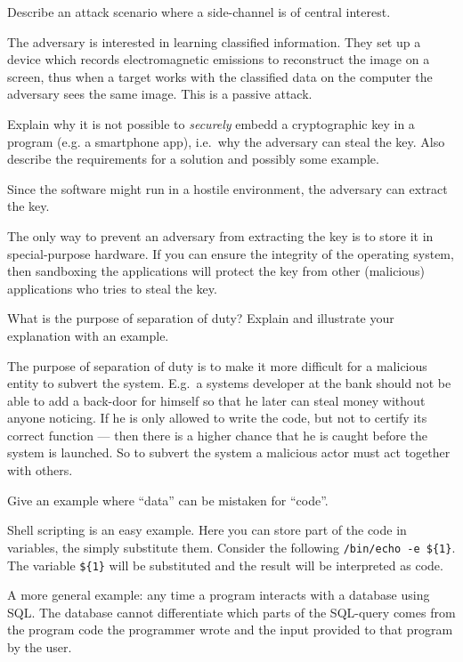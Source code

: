   
\question[3]\label{q:sidechannels}
Describe an attack scenario where a side-channel is of central interest.

\begin{solution}
  The adversary is interested in learning classified information.
  They set up a device which records electromagnetic emissions to reconstruct 
  the image on a screen, thus when a target works with the classified data on 
  the computer the adversary sees the same image.
  This is a passive attack.
\end{solution}

\question[3]
  Explain why it is not possible to \emph{securely} embedd a cryptographic key 
  in a program (e.g. a smartphone app), i.e.\ why the adversary can steal the 
  key.
  Also describe the requirements for a solution and possibly some example.

  \begin{solution}
    Since the software might run in a hostile environment, the adversary can 
    extract the key.

    The only way to prevent an adversary from extracting the key is to store it 
    in special-purpose hardware.
    If you can ensure the integrity of the operating system, then sandboxing 
    the applications will protect the key from other (malicious) applications 
    who tries to steal the key.
  \end{solution}

\question[3]
What is the purpose of separation of duty?
Explain and illustrate your explanation with an example.

\begin{solution}
  The purpose of separation of duty is to make it more difficult for 
  a malicious entity to subvert the system.
  E.g.\ a systems developer at the bank should not be able to add a back-door 
  for himself so that he later can steal money without anyone noticing.
  If he is only allowed to write the code, but not to certify its correct 
  function --- then there is a higher chance that he is caught before the 
  system is launched.
  So to subvert the system a malicious actor must act together with others.
\end{solution}


\question[3]
Give an example where \enquote{data} can be mistaken for \enquote{code}.

\begin{solution}
  Shell scripting is an easy example.
  Here you can store part of the code in variables, the simply substitute them.
  Consider the following \texttt{/bin/echo -e \$\{1\}}.
  The variable \texttt{\$\{1\}} will be substituted and the result will be 
  interpreted as code.

  A more general example: any time a program interacts with a database using 
  SQL.
  The database cannot differentiate which parts of the SQL-query comes from the 
  program code the programmer wrote and the input provided to that program by 
  the user.
\end{solution}


